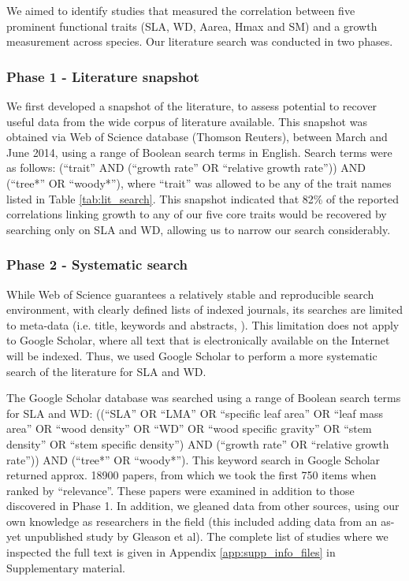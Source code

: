 \documentclass[a4paper,11pt]{article}
\begin{document}
We aimed to identify studies that measured the correlation between five prominent functional traits (SLA, WD, Aarea, Hmax and SM) and a growth measurement across species. Our literature search was conducted in two phases.

\subsubsection*{Phase 1 - Literature snapshot}\label{literature-snapshot}

We first developed a snapshot of the literature, to assess potential to recover useful data from the wide corpus of literature available. This snapshot was obtained via Web of Science database (Thomson Reuters), between March and June 2014, using a range of Boolean search terms in English. Search terms were as follows: (``trait'' AND (``growth rate'' OR ``relative growth rate'')) AND (``tree*'' OR ``woody*''), where ``trait'' was allowed to be any of the trait names listed in Table \ref{tab:lit_search}. This snapshot indicated that 82\% of the reported correlations linking growth to any of our five core traits would be recovered by searching only on SLA and WD, allowing us to narrow our search considerably.

\subsubsection*{Phase 2 - Systematic search}\label{systematic-search}

While Web of Science guarantees a relatively stable and reproducible search environment, with clearly defined lists of indexed journals, its searches are limited to meta-data (i.e. title, keywords and abstracts, \citealt{Beckmann:2012hn}). This limitation does not apply to Google Scholar, where all text that is electronically available on the Internet will be indexed. Thus, we used Google Scholar to perform a more systematic search of the literature for SLA and WD.

The Google Scholar database was searched using a range of Boolean search terms for SLA and WD: ((``SLA'' OR ``LMA'' OR ``specific leaf area'' OR ``leaf mass area'' OR ``wood density'' OR ``WD'' OR ``wood specific gravity'' OR ``stem density'' OR ``stem specific density'') AND (``growth rate'' OR ``relative growth rate'')) AND (``tree*'' OR ``woody*''). This keyword search in Google Scholar returned approx. 18900 papers, from which we took the first 750 items when ranked by ``relevance''.
These papers were examined in addition to those discovered in Phase 1. In addition, we gleaned data from other sources, using our own knowledge as researchers in the field (this included adding data from an as-yet unpublished study by Gleason et al).  The complete list of studies where we inspected the full text is given in Appendix \ref{app:supp_info_files} in Supplementary material.
\end{document}
